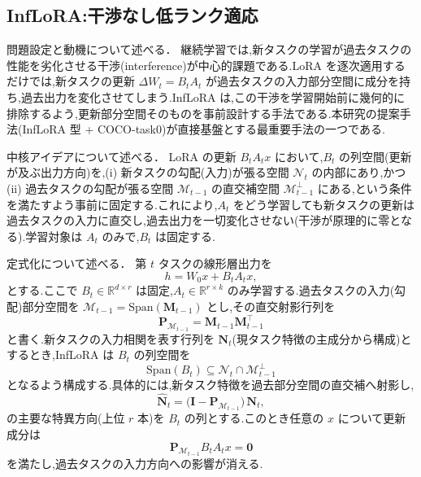 \subsection{InfLoRA:干渉なし低ランク適応}

問題設定と動機について述べる．
継続学習では,新タスクの学習が過去タスクの性能を劣化させる干渉(interference)が中心的課題である.LoRA を逐次適用するだけでは,新タスクの更新 $\Delta W_t = B_t A_t$ が過去タスクの入力部分空間に成分を持ち,過去出力を変化させてしまう.InfLoRA \cite{inflora} は,この干渉を学習開始前に幾何的に排除するよう,更新部分空間そのものを事前設計する手法である.本研究の提案手法(InfLoRA 型 + COCO-task0)が直接基盤とする最重要手法の一つである.

中核アイデアについて述べる．
LoRA の更新 $B_t A_t x$ において,$B_t$ の列空間(更新が及ぶ出力方向)を,(i) 新タスクの勾配(入力)が張る空間 $\mathcal{N}_t$ の内部にあり,かつ (ii) 過去タスクの勾配が張る空間 $\mathcal{M}_{t-1}$ の直交補空間 $\mathcal{M}_{t-1}^{\perp}$ にある,という条件を満たすよう事前に固定する.これにより,$A_t$ をどう学習しても新タスクの更新は過去タスクの入力に直交し,過去出力を一切変化させない(干渉が原理的に零となる).学習対象は $A_t$ のみで,$B_t$ は固定する.

定式化について述べる．
第 $t$ タスクの線形層出力を
\begin{equation}
h = W_0 x + B_t A_t x,
\end{equation}
とする.ここで $B_t \in \mathbb{R}^{d \times r}$ は固定,$A_t \in \mathbb{R}^{r \times k}$ のみ学習する.過去タスクの入力(勾配)部分空間を $\mathcal{M}_{t-1} = \mathrm{Span}(\mathbf{M}_{t-1})$ とし,その直交射影行列を
\begin{equation}
\mathbf{P}_{\mathcal{M}_{t-1}} = \mathbf{M}_{t-1} \mathbf{M}_{t-1}^\top
\end{equation}
と書く.新タスクの入力相関を表す行列を $\mathbf{N}_t$(現タスク特徴の主成分から構成)とするとき,InfLoRA は $B_t$ の列空間を
\begin{equation}
\mathrm{Span}(B_t) \subseteq \mathcal{N}_t \cap \mathcal{M}_{t-1}^{\perp}
\end{equation}
となるよう構成する.具体的には,新タスク特徴を過去部分空間の直交補へ射影し,
\begin{equation}
\widehat{\mathbf{N}}_t = \big(\mathbf{I} - \mathbf{P}_{\mathcal{M}_{t-1}}\big)\,\mathbf{N}_t,
\end{equation}
の主要な特異方向(上位 $r$ 本)を $B_t$ の列とする.このとき任意の $x$ について更新成分は
\begin{equation}
\mathbf{P}_{\mathcal{M}_{t-1}} B_t A_t x = \mathbf{0}
\end{equation}
を満たし,過去タスクの入力方向への影響が消える.

